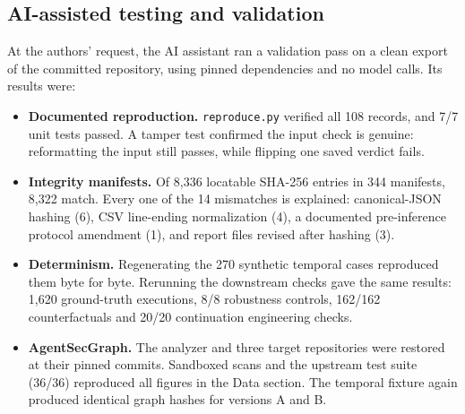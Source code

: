 \documentclass[11pt,letterpaper]{article}
\begin{document}
\subsection{AI-assisted testing and validation}
At the authors' request, the AI assistant ran a validation pass on a clean export of the committed repository, using pinned dependencies and no model calls. Its results were:
\begin{itemize}
\item \textbf{Documented reproduction.} \texttt{reproduce.py} verified all 108 records, and 7/7 unit tests passed. A tamper test confirmed the input check is genuine: reformatting the input still passes, while flipping one saved verdict fails.
\item \textbf{Integrity manifests.} Of 8,336 locatable SHA-256 entries in 344 manifests, 8,322 match. Every one of the 14 mismatches is explained: canonical-JSON hashing (6), CSV line-ending normalization (4), a documented pre-inference protocol amendment (1), and report files revised after hashing (3).
\item \textbf{Determinism.} Regenerating the 270 synthetic temporal cases reproduced them byte for byte. Rerunning the downstream checks gave the same results: 1,620 ground-truth executions, 8/8 robustness controls, 162/162 counterfactuals and 20/20 continuation engineering checks.
\item \textbf{AgentSecGraph.} The analyzer and three target repositories were restored at their pinned commits. Sandboxed scans and the upstream test suite (36/36) reproduced all figures in the Data section. The temporal fixture again produced identical graph hashes for versions A and B.
\end{itemize}
\end{document}
